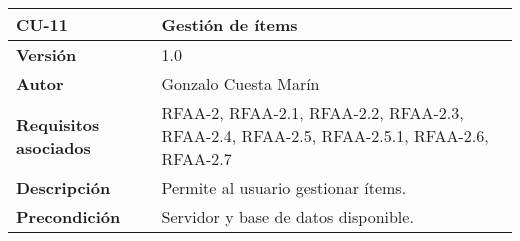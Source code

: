 \begin{longtable}[]{@{}ll@{}}
\toprule
\begin{minipage}[b]{0.21\columnwidth}\raggedright
\textbf{CU-11}\strut
\end{minipage} & \begin{minipage}[b]{0.73\columnwidth}\raggedright
\textbf{Gestión de ítems}\strut
\end{minipage}\tabularnewline
\midrule
\endhead
\begin{minipage}[t]{0.21\columnwidth}\raggedright
\textbf{Versión}\strut
\end{minipage} & \begin{minipage}[t]{0.73\columnwidth}\raggedright
1.0\strut
\end{minipage}\tabularnewline
\begin{minipage}[t]{0.21\columnwidth}\raggedright
\textbf{Autor}\strut
\end{minipage} & \begin{minipage}[t]{0.73\columnwidth}\raggedright
Gonzalo Cuesta Marín\strut
\end{minipage}\tabularnewline
\begin{minipage}[t]{0.21\columnwidth}\raggedright
\textbf{Requisitos asociados}\strut
\end{minipage} & \begin{minipage}[t]{0.73\columnwidth}\raggedright
RFAA-2, RFAA-2.1, RFAA-2.2, RFAA-2.3, RFAA-2.4, RFAA-2.5, RFAA-2.5.1,
RFAA-2.6, RFAA-2.7\strut
\end{minipage}\tabularnewline
\begin{minipage}[t]{0.21\columnwidth}\raggedright
\textbf{Descripción}\strut
\end{minipage} & \begin{minipage}[t]{0.73\columnwidth}\raggedright
Permite al usuario gestionar ítems.\strut
\end{minipage}\tabularnewline
\begin{minipage}[t]{0.21\columnwidth}\raggedright
\textbf{Precondición}\strut
\end{minipage} & \begin{minipage}[t]{0.73\columnwidth}\raggedright
Servidor y base de datos disponible.


\end{minipage}
\end{longtable}
